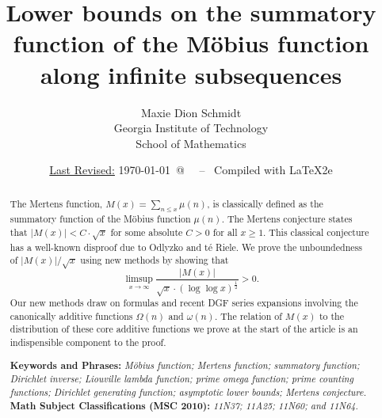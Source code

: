 \documentclass[11pt,reqno,a4letter]{article}
\title{
       \LARGE{
       Lower bounds on the summatory function of the M\"obius function along infinite subsequences 
       } 
}
\author{{\Large Maxie Dion Schmidt} \\ 
        {\normalsize Georgia Institute of Technology} \\[0.025cm] 
        {\normalsize School of Mathematics} 
}
\date{\small\underline{Last Revised:} \today \ @\ \hhmmsstime{} \ -- \ Compiled with \LaTeX2e}
\numberwithin{figure}{section}
\numberwithin{table}{section}
\theoremstyle{plain}
\numberwithin{theorem}{section}
\theoremstyle{definition}
\begin{document}
 

\maketitle

\begin{abstract} 
The Mertens function, $M(x) = \sum_{n \leq x} \mu(n)$, is classically 
defined as the summatory function of the M\"obius function $\mu(n)$. 
The Mertens conjecture states that $|M(x)| < C \cdot \sqrt{x}$ for some absolute $C > 0$ for all 
$x \geq 1$. 
This classical conjecture has a well-known disproof due to 
Odlyzko and t\'{e} Riele. 
We prove the unboundedness of $|M(x)| / \sqrt{x}$ using new methods by showing that 
$$\limsup_{x \rightarrow \infty} \frac{|M(x)|}{\sqrt{x} \cdot (\log\log x)^{\frac{1}{2}}} > 0.$$ 
Our new methods draw on formulas and recent DGF series expansions involving the canonically 
additive functions $\Omega(n)$ and $\omega(n)$. 
The relation of $M(x)$ to the distribution of these core additive functions 
we prove at the start of the article is an indispensible component to the proof. 

\bigskip 
\noindent
\textbf{Keywords and Phrases:} {\it M\"obius function; Mertens function; summatory function; 
                                    Dirichlet inverse; Liouville lambda function; prime omega function; 
                                    prime counting functions; Dirichlet generating function; 
                                    asymptotic lower bounds; Mertens conjecture. } \\ 
\textbf{Math Subject Classifications (MSC 2010):} {\it 11N37; 11A25; 11N60; and 11N64. } 
\end{abstract} 
\end{document}
